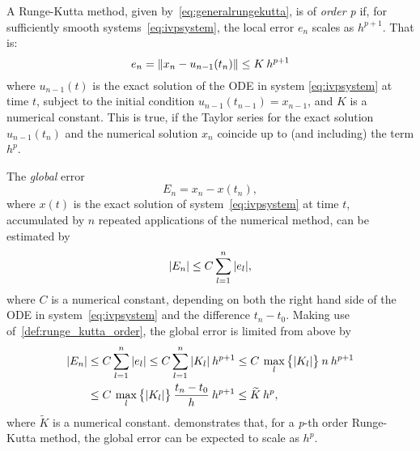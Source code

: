 \begin{defn}
    \label{def:runge_kutta_order}
    A Runge-Kutta method, given by~\cref{eq:generalrungekutta}, is of
    \emph{order p} if, for sufficiently smooth systems~\eqref{eq:ivpsystem},
    the local error $e_{n}$ scales as $h^{p+1}$. That is:
    \begin{equation}
        \label{eq:rungekuttaorder}
        e_{n} = \norm{x_{n}-u_{n-1}(t_{n})} \leq K\hspace{0.5ex}h^{p+1}
    \end{equation}
    where $u_{n-1}(t)$ is the exact solution of the ODE in system
    \eqref{eq:ivpsystem} at time $t$, subject to the initial condition
    $u_{n-1}(t_{n-1}) = x_{n-1}$, and $K$ is a numerical constant. This is true,
    if the Taylor series for the exact solution $u_{n-1}(t_{n})$ and the
    numerical solution $x_{n}$ coincide up to (and including) the term $h^{p}$.
\end{defn}%
The \emph{global} error
\begin{equation}
    \label{eq:globalrungekuttaerror}
    E_{n} = x_{n}-x(t_{n}),
\end{equation}
where $x(t)$ is the exact solution of system~\eqref{eq:ivpsystem} at time $t$,
accumulated by $n$ repeated applications of the numerical method, can be
estimated by
\begin{equation}
    \label{eq:globalrungekuttaerrorapprox}
    \abs{E_{n}} \leq C\sum\limits_{l=1}^{n}\abs{e_{l}},
\end{equation}
where $C$ is a numerical constant, depending on both the right hand side of the
ODE in system~\eqref{eq:ivpsystem} and the difference $t_{n}-t_{0}$. Making
use of~\cref{def:runge_kutta_order}, the global error is limited from above by
\begin{equation}
    \label{eq:globalrungekuttaerrorestimate}
    \begin{aligned}
        \abs{E_{n}} &\leq C\sum\limits_{l=1}^{n}\abs{e_{l}} %
        \leq C\sum\limits_{l=1}^{n}\abs{K_{l}}\hspace{0.5ex}h^{p+1}%
        \leq C\hspace{0.5ex}\max\limits_{l}\big\{\abs{K_{l}}\big\}\hspace{0.5ex}n\hspace{0.5ex}h^{p+1}\\
        &\leq C\hspace{0.5ex}\max\limits_{l}\big\{\abs{K_{l}}\big\}\hspace{0.5ex}\frac{t_{n}-t_{0}}{h}\hspace{0.5ex}h^{p+1}
        \leq \widetilde{K}\hspace{0.5ex}h^{p},
    \end{aligned}
\end{equation}
where $\widetilde{K}$ is a numerical constant.
 demonstrates that, for a \emph{p}-th
order Runge-Kutta method, the global error can be expected to scale as $h^{p}$.


